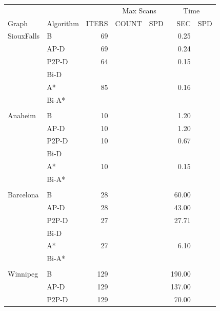 \begin{table}[H]
    \centering
    \begin{tabular}{l l r rr rr } \toprule
        & & & \multicolumn{2}{c}{Max Scans} & \multicolumn{2}{c}{Time} \\ 
        \cmidrule(lr){4-5}
        \cmidrule(lr){6-7}
        Graph & Algorithm & ITERS & COUNT & SPD                     & SEC & SPD \\ 
        \cmidrule(lr){1-1}
        \cmidrule(lr){2-2}
        \cmidrule(lr){3-3}
        \cmidrule(lr){4-4}
        \cmidrule(lr){5-5}
        \cmidrule(lr){6-6}
        \cmidrule(lr){7-7}
        SiouxFalls    & B     & 69 & & & 0.25 & \\
                      & AP-D  & 69 & & & 0.24 & \\
                      & P2P-D & 64 & & & 0.15 & \\
                      & Bi-D  & & & & & \\
                      & A*    & 85 & & & 0.16 & \\
                      & Bi-A* & & & & & \\ \\
        Anaheim       & B     & 10 & & & 1.20 & \\
                      & AP-D  & 10 & & & 1.20 & \\
                      & P2P-D & 10 & & & 0.67 & \\
                      & Bi-D  & & & & & \\
                      & A*    & 10 & & & 0.15 & \\
                      & Bi-A* & & & & & \\ \\
        Barcelona     & B     & 28 & & & 60.00 & \\
                      & AP-D  & 28 & & & 43.00 & \\
                      & P2P-D & 27 & & & 27.71 & \\
                      & Bi-D  & & & & & \\
                      & A*    & 27 & & &  6.10 & \\
                      & Bi-A* & & & & & \\ \\
        Winnipeg      & B     & 129 & & & 190.00 & \\
                      & AP-D  & 129 & & & 137.00 & \\
                      & P2P-D & 129 & & &  70.00 & \\

\end{tabular}
\end{table}
